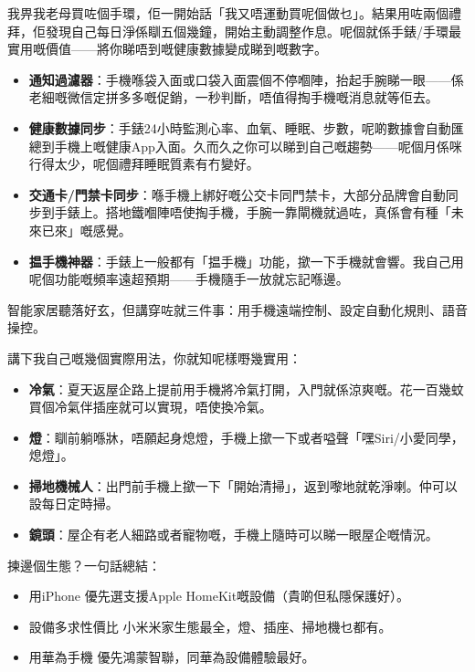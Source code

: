 
我畀我老母買咗個手環，佢一開始話「我又唔運動買呢個做乜」。結果用咗兩個禮拜，佢發現自己每日淨係瞓五個幾鐘，開始主動調整作息。呢個就係手錶/手環最實用嘅價值——將你睇唔到嘅健康數據變成睇到嘅數字。

\begin{itemize}
  \item \textbf{通知過濾器}：手機喺袋入面或口袋入面震個不停嗰陣，抬起手腕睇一眼——係老細嘅微信定拼多多嘅促銷，一秒判斷，唔值得掏手機嘅消息就等佢去。
  \item \textbf{健康數據同步}：手錶24小時監測心率、血氧、睡眠、步數，呢啲數據會自動匯總到手機上嘅健康App入面。久而久之你可以睇到自己嘅趨勢——呢個月係咪行得太少，呢個禮拜睡眠質素有冇變好。
  \item \textbf{交通卡/門禁卡同步}：喺手機上綁好嘅公交卡同門禁卡，大部分品牌會自動同步到手錶上。搭地鐵嗰陣唔使掏手機，手腕一靠閘機就過咗，真係會有種「未來已來」嘅感覺。
  \item \textbf{揾手機神器}：手錶上一般都有「揾手機」功能，撳一下手機就會響。我自己用呢個功能嘅頻率遠超預期——手機隨手一放就忘記喺邊。
\end{itemize}


智能家居聽落好玄，但講穿咗就三件事：用手機遠端控制、設定自動化規則、語音操控。

講下我自己嘅幾個實際用法，你就知呢樣嘢幾實用：

\begin{itemize}
  \item \textbf{冷氣}：夏天返屋企路上提前用手機將冷氣打開，入門就係涼爽嘅。花一百幾蚊買個冷氣伴插座就可以實現，唔使換冷氣。
  \item \textbf{燈}：瞓前躺喺牀，唔願起身熄燈，手機上撳一下或者嗌聲「嘿Siri/小愛同學，熄燈」。
  \item \textbf{掃地機械人}：出門前手機上撳一下「開始清掃」，返到嚟地就乾淨喇。仲可以設每日定時掃。
  \item \textbf{鏡頭}：屋企有老人細路或者寵物嘅，手機上隨時可以睇一眼屋企嘅情況。
\end{itemize}

揀邊個生態？一句話總結：

\begin{itemize}
  \item 用iPhone 優先選支援Apple HomeKit嘅設備（貴啲但私隱保護好）。
  \item 設備多求性價比 小米米家生態最全，燈、插座、掃地機乜都有。
  \item 用華為手機 優先鴻蒙智聯，同華為設備體驗最好。
\end{itemize}

